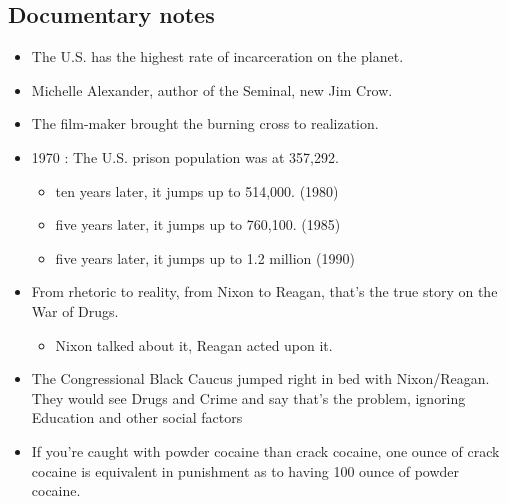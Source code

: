 \documentclass[11pt]{article}
\begin{document}
\subsection{Documentary notes}
\label{sec:org08e7cfb}
\begin{itemize}
\item The U.S. has the highest rate of incarceration on the planet.
\item Michelle Alexander, author of the Seminal, new Jim Crow.
\item The film-maker brought the burning cross to realization.
\item 1970 : The U.S. prison population was at 357,292.
\begin{itemize}
\item ten years later, it jumps up to 514,000. (1980)
\item five years later, it jumps up to 760,100. (1985)
\item five years later, it jumps up to 1.2 million (1990)
\end{itemize}

\item From rhetoric to reality, from Nixon to Reagan, that's the true story on the War of Drugs.
\begin{itemize}
\item Nixon talked about it, Reagan acted upon it.
\end{itemize}
\item The Congressional Black Caucus jumped right in bed with Nixon/Reagan. They would see Drugs and Crime and say that's the problem, ignoring Education and other social factors
\item If you're caught with powder cocaine than crack cocaine, one ounce of crack cocaine is equivalent in punishment as to having 100 ounce of powder cocaine.
\end{itemize}
\end{document}
